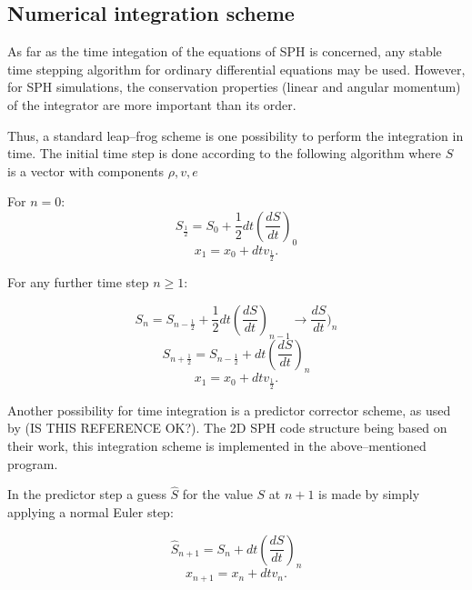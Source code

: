\documentclass{report}
\begin{document}
\subsection{Numerical integration scheme}
\label{sec:numIntegr}

As far as the time integation of the equations of SPH is concerned, any stable
time stepping algorithm for ordinary differential equations may be
used\cite{Monaghan2005}. However, for SPH simulations, the conservation properties
(linear and angular momentum) of the integrator are more important than its
order\cite{Monaghan2005}.

Thus, a standard leap--frog scheme is one possibility to perform the integration in
time. The initial time step is done according to the following algorithm where
$S$ is a vector with components  $\rho,v,e$

For $n=0$:
\begin{equation}
S_{\frac{1}{2}}=S_0+\frac{1}{2}dt\left(\frac{dS}{dt}\right)_0
\end{equation}
\begin{equation}
x_1=x_0+dt v_{\frac{1}{2}}.
\end{equation}

For any further time step $n\ge1$:

\begin{equation}
S_n=S_{n-\frac{1}{2}}+\frac{1}{2}dt\left(\frac{dS}{dt}\right)_{n-1} \rightarrow
\frac{dS}{dt})_n 
\end{equation}
\begin{equation}
S_{n+\frac{1}{2}}=S_{n-\frac{1}{2}}+dt\left(\frac{dS}{dt}\right)_n 
\end{equation}
\begin{equation}
x_1=x_0+dt v_{\frac{1}{2}}.
\end{equation}

Another possibility for time integration is a predictor corrector scheme, as
used by \cite{Hu2007}(IS THIS REFERENCE OK?). The 2D SPH code structure being based on their work,
this integration scheme is implemented in the above--mentioned program.

In the predictor step a guess $\hat S$ for the value $S$ at $n+1$ is made by simply
applying a normal Euler step:

\begin{equation}
\hat S_{n+1}=S_n+dt\left(\frac{dS}{dt}\right)_n
\end{equation}
\begin{equation}
x_{n+1}=x_n+dt v_{n}.
\end{equation}
\end{document}
